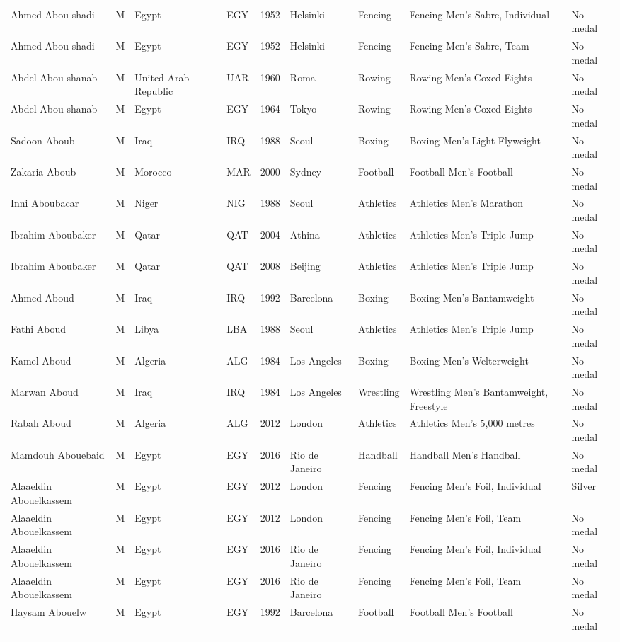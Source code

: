 \documentclass{article}%
\begin{document}
\begin{longtable}{p{1.5cm} p{0.5cm} p{2cm} p{1cm} p{1cm} p{1.5cm} p{1.5cm} p{5cm} p{1.5cm}}
Ahmed Abou{-}shadi&M&Egypt&EGY&1952&Helsinki&Fencing&Fencing Men's Sabre, Individual&No medal\\%
Ahmed Abou{-}shadi&M&Egypt&EGY&1952&Helsinki&Fencing&Fencing Men's Sabre, Team&No medal\\%
Abdel Abou{-}shanab&M&United Arab Republic&UAR&1960&Roma&Rowing&Rowing Men's Coxed Eights&No medal\\%
Abdel Abou{-}shanab&M&Egypt&EGY&1964&Tokyo&Rowing&Rowing Men's Coxed Eights&No medal\\%
Sadoon Aboub&M&Iraq&IRQ&1988&Seoul&Boxing&Boxing Men's Light{-}Flyweight&No medal\\%
Zakaria Aboub&M&Morocco&MAR&2000&Sydney&Football&Football Men's Football&No medal\\%
Inni Aboubacar&M&Niger&NIG&1988&Seoul&Athletics&Athletics Men's Marathon&No medal\\%
Ibrahim Aboubaker&M&Qatar&QAT&2004&Athina&Athletics&Athletics Men's Triple Jump&No medal\\%
Ibrahim Aboubaker&M&Qatar&QAT&2008&Beijing&Athletics&Athletics Men's Triple Jump&No medal\\%
Ahmed Aboud&M&Iraq&IRQ&1992&Barcelona&Boxing&Boxing Men's Bantamweight&No medal\\%
Fathi Aboud&M&Libya&LBA&1988&Seoul&Athletics&Athletics Men's Triple Jump&No medal\\%
Kamel Aboud&M&Algeria&ALG&1984&Los Angeles&Boxing&Boxing Men's Welterweight&No medal\\%
Marwan Aboud&M&Iraq&IRQ&1984&Los Angeles&Wrestling&Wrestling Men's Bantamweight, Freestyle&No medal\\%
Rabah Aboud&M&Algeria&ALG&2012&London&Athletics&Athletics Men's 5,000 metres&No medal\\%
Mamdouh Abouebaid&M&Egypt&EGY&2016&Rio de Janeiro&Handball&Handball Men's Handball&No medal\\%
Alaaeldin Abouelkassem&M&Egypt&EGY&2012&London&Fencing&Fencing Men's Foil, Individual&Silver\\%
Alaaeldin Abouelkassem&M&Egypt&EGY&2012&London&Fencing&Fencing Men's Foil, Team&No medal\\%
Alaaeldin Abouelkassem&M&Egypt&EGY&2016&Rio de Janeiro&Fencing&Fencing Men's Foil, Individual&No medal\\%
Alaaeldin Abouelkassem&M&Egypt&EGY&2016&Rio de Janeiro&Fencing&Fencing Men's Foil, Team&No medal\\%
Haysam Abouelw&M&Egypt&EGY&1992&Barcelona&Football&Football Men's Football&No medal\\%

\end{longtable}
\end{document}
